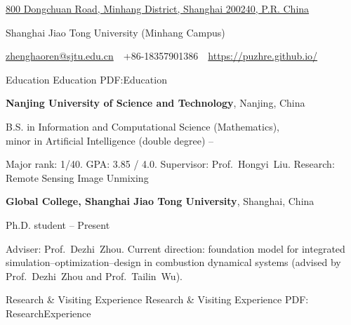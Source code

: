 \documentclass[letterpaper,MMMyyyy,nonstopmode]{simpleresumecv}
\newcommand{\CVAuthor}{Haoren Zheng}
\newcommand{\CVWebpage}{https://puzhre.github.io/}
\begin{document}

\Title{\CVAuthor}

\begin{SubTitle}
\href{https://www.google.com/maps/place/800+Dongchuan+Road,+Minhang+District,+Shanghai}
{800 Dongchuan Road, Minhang District, Shanghai 200240, P.R. China}
\par
Shanghai Jiao Tong University (Minhang Campus)
\par
\href{mailto:zhenghaoren@sjtu.edu.cn}
{zhenghaoren@sjtu.edu.cn}
\,\SubBulletSymbol\,
+86-18357901386
\,\SubBulletSymbol\,
\href{\CVWebpage}
{\url{\CVWebpage}}
\end{SubTitle}

\begin{Body}

\Section
{Education}
{Education}
{PDF:Education}

\Entry
{\textbf{Nanjing University of Science and Technology}},
Nanjing, China

\Gap
\BulletItem
B.S. in Information and Computational Science (Mathematics),\\
minor in Artificial Intelligence (double degree)
\hfill
{} --
\begin{Detail}
\SubBulletItem
Major rank: 1/40.
\SubBulletItem
GPA: 3.85 / 4.0.
\SubBulletItem
Supervisor: Prof.~Hongyi~Liu.
\SubBulletItem
Research: Remote Sensing Image Unmixing
\end{Detail}


\BigGap
\Entry
{\textbf{Global College, Shanghai Jiao Tong University}},
Shanghai, China

\Gap
\BulletItem
Ph.D. student
\hfill
{} --
Present
\begin{Detail}
\SubBulletItem
Adviser: Prof.~Dezhi~Zhou.
\SubBulletItem
Current direction: foundation model for integrated simulation--optimization--design in combustion dynamical systems (advised by Prof.~Dezhi~Zhou and Prof.~Tailin~Wu).
\end{Detail}

\Section
{Research \& Visiting Experience}
{Research \& Visiting Experience}
{PDF: ResearchExperience}




\end{Body}
\end{document}
